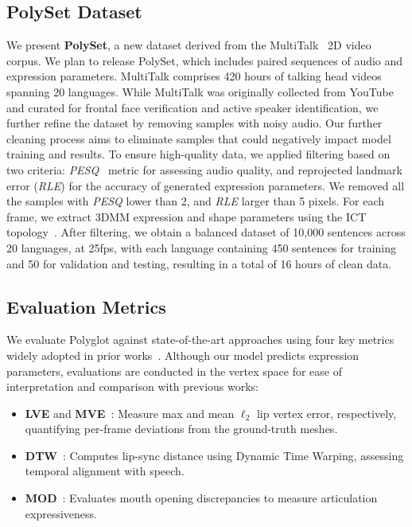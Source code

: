 \documentclass[a4paper, 10pt, conference]{ieeeconf}      %
\begin{document}
\subsection{PolySet Dataset}
\label{sec:dataset}
We present \textbf{PolySet}, a new dataset derived from the MultiTalk~\cite{sungbin2024multitalkenhancing3dtalking} 2D video corpus.  We plan to release PolySet, which includes paired sequences of audio and expression parameters. MultiTalk comprises 420 hours of talking head videos spanning 20 languages. While MultiTalk was originally collected from YouTube and curated for frontal face verification and active speaker identification, we further refine the dataset by removing samples with noisy audio.
Our further cleaning process aims to eliminate samples that could negatively impact model training and results. To ensure high-quality data, we applied filtering based on two criteria: \textit{PESQ}~\cite{pesq,kumar2023torchaudio} metric for assessing audio quality, and reprojected landmark error (\textit{RLE}) for the accuracy of generated expression parameters. We removed all the samples with \textit{PESQ} lower than 2, and \textit{RLE} larger than 5 pixels.
For each frame, we extract 3DMM expression and shape parameters using the ICT topology~\cite{ict}. 
After filtering, we obtain a balanced dataset of 10,000 sentences across 20 languages, at 25fps, with each language containing 450 sentences for training and 50 for validation and testing, resulting in a total of 16 hours of clean data. 
\subsection{Evaluation Metrics}
\label{sec:metrics}

We evaluate Polyglot against state-of-the-art approaches using four key metrics widely adopted in prior works~\cite{facexhubert, FaceDiffuser_Stan_MIG2023, Fan_Lin_Saito_Wang_Komura_faceformer_2022, nocentini2024scantalk3dtalkingheads, nocentini2024emovocaspeechdrivenemotional3d, nocentini2024fixedtopologiesunregisteredtraining, Thambiraja_2023_ICCV_imitator, sun2023diffposetalk}. Although our model predicts expression parameters, evaluations are conducted in the vertex space for ease of interpretation and comparison with previous works:  

\begin{itemize}
    \item \textbf{LVE} and \textbf{MVE}~\cite{Fan_Lin_Saito_Wang_Komura_faceformer_2022, facexhubert, landmarks_3D_Nocentini_2023}: Measure max and mean $\ell_2$ lip vertex error, respectively, quantifying per-frame deviations from the ground-truth meshes.  
    \item \textbf{DTW}~\cite{nocentini2024fixedtopologiesunregisteredtraining, Thambiraja_2023_ICCV_imitator}: Computes lip-sync distance using Dynamic Time Warping, assessing temporal alignment with speech.  
    \item \textbf{MOD}~\cite{sun2023diffposetalk}: Evaluates mouth opening discrepancies to measure articulation expressiveness.  
\end{itemize}
\end{document}
